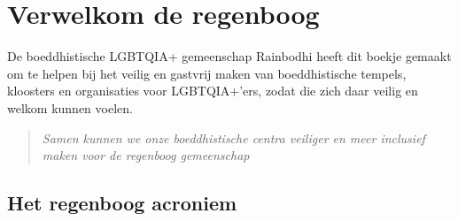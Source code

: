 \documentclass[12pt,openany]{book}
\begin{document}
\begin{figure}[h]
\end{figure}

\thispagestyle{empty}

\mainmatter
\chapter*{Verwelkom de regenboog}

De boeddhistische LGBTQIA+ gemeenschap Rainbodhi heeft dit boekje gemaakt om  te helpen bij het veilig en gastvrij maken van boeddhistische tempels, kloosters en organisaties voor LGBTQIA+’ers, zodat die zich daar veilig en welkom kunnen voelen.

\bigskip

\begin{quote}
\textit{Samen kunnen we onze boeddhistische centra veiliger en meer inclusief maken voor de regenboog gemeenschap}
\end{quote}

\bigskip
{}
\section*{Het regenboog acroniem}
\end{document}
